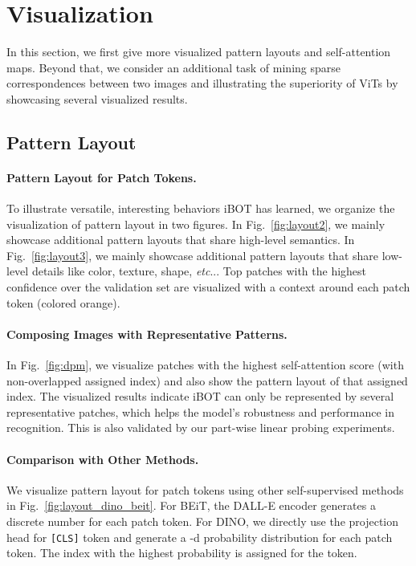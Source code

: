 \documentclass{article} \usepackage{iclr2022_conference,times}
\makeatletter
\def\vs{{\bm{s}}}
\def\ourmethod{{iBOT}\xspace}
\DeclareRobustCommand\onedot{\futurelet\@let@token\@onedot}
\def\@onedot{\ifx\@let@token.\else.\null\fi\xspace}
\def\etc{\emph{etc}\onedot} \def\vs{\emph{vs}\onedot}
\makeatother
\begin{document}
         
\section{Visualization}
\label{sec:visualiz}

In this section, we first give more visualized pattern layouts and self-attention maps. Beyond that, we consider an additional task of mining sparse correspondences between two images and illustrating the superiority of ViTs by showcasing several visualized results.

\subsection{Pattern Layout}
\label{sec:patternlayout}

\paragraph{Pattern Layout for Patch Tokens.} To illustrate versatile, interesting behaviors \ourmethod has learned, we organize the visualization of pattern layout in two figures. 
In Fig.~\ref{fig:layout2}, we mainly showcase additional pattern layouts that share high-level semantics. 
In Fig.~\ref{fig:layout3}, we mainly showcase additional pattern layouts that share low-level details like color, texture, shape, \etc. Top  patches with the highest confidence over the validation set are visualized with a  context around each  patch token (colored orange).

\paragraph{Composing Images with Representative Patterns.} 
In Fig.~\ref{fig:dpm}, we visualize  patches with the highest self-attention score (with non-overlapped assigned index) and also show the pattern layout of that assigned index. 
The visualized results indicate \ourmethod can only be represented by several representative patches, which helps the model's robustness and performance in recognition. This is also validated by our part-wise linear probing experiments.


\paragraph{Comparison with Other Methods.} We visualize pattern layout for patch tokens using other self-supervised methods \citep{beit,dino} in Fig.~\ref{fig:layout_dino_beit}. For BEiT, the DALL-E encoder generates a discrete number for each patch token. For DINO, we directly use the projection head for \texttt{[CLS]} token and generate a -d probability distribution for each patch token. The index with the highest probability is assigned for the token.
\end{document}
